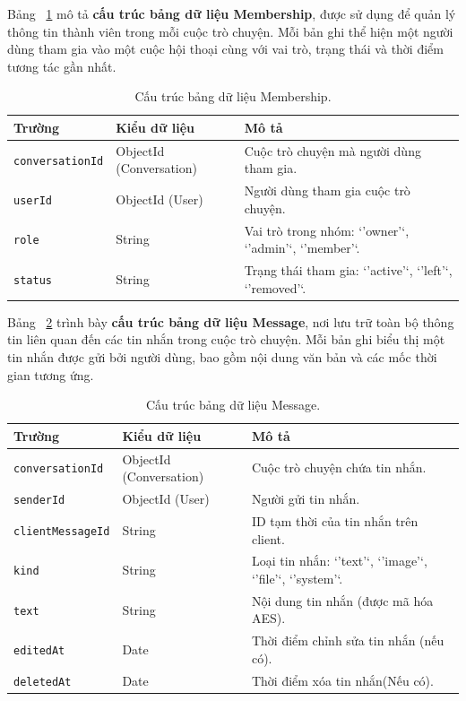 \indent Bảng ~\ref{tab:membership} mô tả \textbf{cấu trúc bảng dữ liệu Membership}, được sử dụng để quản lý thông tin thành viên trong mỗi cuộc trò chuyện.  
Mỗi bản ghi thể hiện một người dùng tham gia vào một cuộc hội thoại cùng với vai trò, trạng thái và thời điểm tương tác gần nhất.

\begin{table}[H]
\centering
\caption{Cấu trúc bảng dữ liệu Membership.}
\label{tab:membership}
\begin{tabularx}{\textwidth}{|p{4cm}|p{3cm}|X|}
\hline
\textbf{Trường} & \textbf{Kiểu dữ liệu} & \textbf{Mô tả} \\ \hline
\texttt{conversationId} & ObjectId (Conversation) & Cuộc trò chuyện mà người dùng tham gia. \\ \hline
\texttt{userId} & ObjectId (User) & Người dùng tham gia cuộc trò chuyện. \\ \hline
\texttt{role} & String & Vai trò trong nhóm: `'owner'`, `'admin'`, `'member'`. \\ \hline
\texttt{status} & String & Trạng thái tham gia: `'active'`, `'left'`, `'removed'`. \\ \hline
\end{tabularx}
\end{table}

\indent Bảng ~\ref{tab:message} trình bày \textbf{cấu trúc bảng dữ liệu Message}, nơi lưu trữ toàn bộ thông tin liên quan đến các tin nhắn trong cuộc trò chuyện.  
Mỗi bản ghi biểu thị một tin nhắn được gửi bởi người dùng, bao gồm nội dung văn bản và các mốc thời gian tương ứng.

\begin{table}[H]
\centering
\caption{Cấu trúc bảng dữ liệu Message.}
\label{tab:message}
\begin{tabularx}{\textwidth}{|p{4cm}|p{3cm}|X|}
\hline
\textbf{Trường} & \textbf{Kiểu dữ liệu} & \textbf{Mô tả} \\ \hline
\texttt{conversationId} & ObjectId (Conversation) & Cuộc trò chuyện chứa tin nhắn. \\ \hline
\texttt{senderId} & ObjectId (User) & Người gửi tin nhắn. \\ \hline
\texttt{clientMessageId} & String & ID tạm thời của tin nhắn trên client. \\ \hline
\texttt{kind} & String & Loại tin nhắn: `'text'`, `'image'`, `'file'`, `'system'`. \\ \hline
\texttt{text} & String & Nội dung tin nhắn (được mã hóa AES). \\ \hline
\texttt{editedAt} & Date & Thời điểm chỉnh sửa tin nhắn (nếu có). \\ \hline
\texttt{deletedAt} & Date & Thời điểm xóa tin nhắn(Nếu có). \\ \hline
\end{tabularx}
\end{table}

